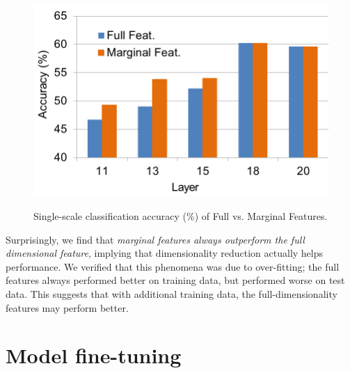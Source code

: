 \documentclass[10pt,twocolumn,letterpaper]{article}
\newcommand{\deva}[1]{\textcolor{red}{[Deva: #1]}}
\begin{document}
\begin{figure}[htbp]
\centering
	{\includegraphics[width=.8\columnwidth]{fig/full_marg.png}}

\caption{Single-scale classification accuracy (\%) of Full vs. Marginal Features.}
\label{fig:full_marg}
\end{figure}


%
%

Surprisingly, we find that {\em marginal features always outperform the full dimensional feature}, implying that dimensionality reduction actually helps performance. We verified that this phenomena was due to over-fitting; the full features always performed better on training data, but performed worse on test data. This suggests that with additional training data, the full-dimensionality features may perform better.

\section{Model fine-tuning}
\end{document}
